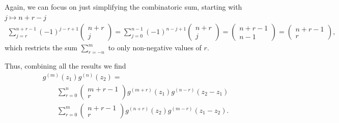 Again, we can focus on just simplifying the combinatoric sum, starting with $j \mapsto n+r-j$
\begin{align}
    \sum_{j=r}^{n+r-1} (-1)^{j-r+1} \begin{pmatrix}n+r \\ j\end{pmatrix} = \sum_{j=0}^{n-1} (-1)^{n-j+1} \begin{pmatrix}n+r \\ j\end{pmatrix} = \begin{pmatrix} n+r-1 \\ n-1 \end{pmatrix} = \begin{pmatrix} n+r-1 \\ r \end{pmatrix},
\end{align}
which restricts the sum $\sum_{r=-n}^m$ to only non-negative values of $r$.

\newpage

Thus, combining all the results we find
\begin{align}
    & g^{(m)}(z_1)g^{(n)}(z_2) = \\
    & \quad \quad \sum_{r=0}^n \begin{pmatrix} m+r-1 \\ r \end{pmatrix} g^{(m+r)}(z_1) g^{(n-r)}(z_2-z_1) \\
    & \quad \quad \sum_{r=0}^m \begin{pmatrix} n+r-1 \\ r \end{pmatrix} g^{(n+r)}(z_2) g^{(m-r)}(z_1-z_2).
\end{align}